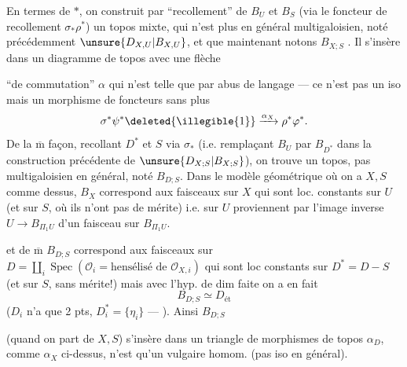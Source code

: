 En termes de $*$, on construit par ``recollement'' de $B_U$ et  $B_S$ (via le foncteur de recollement $\sigma_*\rho^*$) un topos mixte, qui n'est plus en général multigaloisien, noté précédemment $\unsure{D_{X,U}|B_{X,U}}$, et que maintenant notons $B_{X;S}$   . Il s'insère dans un diagramme de topos
avec une flèche


``de commutation'' $\alpha$ qui n'est telle que par abus de langage --- ce n'est pas un iso  mais un morphisme de foncteurs sans plus
\[
 \sigma^*\psi^*\deleted{\illegible{1}}\xrightarrow{\alpha_X}\rho^*\varphi^*.
\]
De la $\overline{\mathrm m}$ façon, recollant $D^*$ et $S$ via $\sigma_*$ (i.e. remplaçant $B_U$ par $B_{D^*}$ dans la construction précédente de $\unsure{D_{X;S}|B_{X;S}}$), on trouve un topos, pas multigaloisien en général, noté $B_{D;S}$. Dans le  modèle géométrique où on a $X,S$ comme dessus,
$B_X$ correspond aux faisceaux sur $X$ qui sont  loc. constants sur $U$ (et sur $S$, où ils n'ont pas de mérite) i.e. sur $U$ proviennent par l'image inverse  $U\longrightarrow B_{\Pi_1 U}$ d'un faisceau sur $B_{\Pi_1 U}$.

et de $\overline{\mathrm m}$ $B_{D;S}$ correspond aux faisceaux sur $D=\coprod_i\operatorname{Spec}(\mathcal O_i=\text{hensélisé de }\mathcal O_{X,i})$  qui sont loc constants sur $D^*=D-S$ (et sur $S$, sans mérite!) mais avec l'hyp. de dim faite on a en fait
\[
 B_{D;S}\simeq D_{\text{ét}}
\]
($D_i$ n'a que 2 pts, $D_i^*=\{\eta_i\}$ --- ). Ainsi $B_{D;S}$ 


(quand on part de $X,S$) s'insère dans un triangle de morphismes de topos
$\alpha_D$, comme $\alpha_X$ ci-dessus, n'est qu'un vulgaire homom. (pas iso en général).

